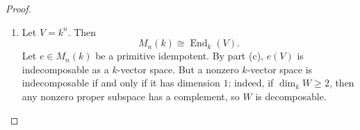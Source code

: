 \begin{proof}
\begin{enumerate}
              Choose isomorphisms
              \[
                  \alpha\colon e_1(V)\xrightarrow{\sim} e_2(V),
                  \qquad
                  \beta\colon \ker(e_1)\xrightarrow{\sim} \ker(e_2).
              \]
              Using the decompositions
              \[
                  V=e_1(V)\oplus \ker(e_1)
                  \qquad\text{and}\qquad
                  V=e_2(V)\oplus \ker(e_2),
              \]
              define
              \[
                  u\colon V\to V,
                  \qquad
                  u(x+y)=\alpha(x)+\beta(y)
                  \quad
                  \bigl(x\in e_1(V),\ y\in \ker(e_1)\bigr).
              \]
              Then \(u\) is an invertible \(A\)-endomorphism of \(V\). For \(x\in e_1(V)\) and
              \(y\in \ker(e_1)\),
              \[
                  ue_1(x+y)=u(x)=\alpha(x),
              \]
              while
              \[
                  e_2u(x+y)=e_2\bigl(\alpha(x)+\beta(y)\bigr)=\alpha(x),
              \]
              because \(e_2\) is the identity on \(e_2(V)\) and zero on \(\ker(e_2)\).
              Hence
              \[
                  ue_1=e_2u,
              \]
              so
              \[
                  e_2=ue_1u^{-1}.
              \]
              Thus \(e_1\) and \(e_2\) are conjugate by an invertible element of
              \(\operatorname{End}_A(V)\).

        \item Let \(V=k^n\). Then
              \[
                  M_n(k)\cong \operatorname{End}_k(V).
              \]
              Let \(e\in M_n(k)\) be a primitive idempotent. By part (c), \(e(V)\) is indecomposable
              as a \(k\)-vector space. But a nonzero \(k\)-vector space is indecomposable if and only if
              it has dimension \(1\): indeed, if \(\dim_k W\ge 2\), then any nonzero proper subspace has
              a complement, so \(W\) is decomposable.


\end{enumerate}
\end{proof}
